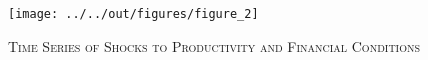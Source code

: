 \begin{figure}[t]
    \begin{center}
	    \texttt{[image: ../../out/figures/figure\_2]}
    	\caption{\textsc{Time Series of Shocks to Productivity and Financial Conditions}}
	    \label{fig:figure_2}
    \end{center}
\end{figure}
